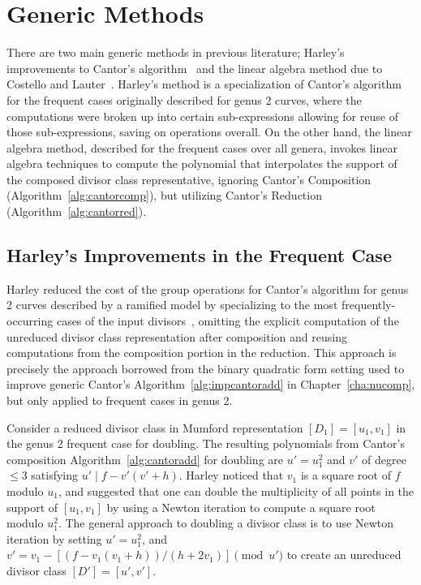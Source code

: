 \section{Generic Methods}
\label{sec:prevGenMethods}
There are two main generic methods in previous literature; Harley's improvements
to Cantor's algorithm~\cite{Harley_explicit_2000} and the linear algebra method
due to Costello and Lauter~\cite{CostelloLauter_geo_2011}. Harley's method is a
specialization of Cantor's algorithm for the frequent cases originally described
for genus 2 curves, where the computations were broken up into certain
sub-expressions allowing for reuse of those sub-expressions, saving on
operations overall. On the other hand, the linear algebra method, described for
the frequent cases over all genera, invokes linear algebra techniques to compute
the polynomial that interpolates the support of the composed divisor class
representative, ignoring Cantor's Composition (Algorithm~\ref{alg:cantorcomp}),
but utilizing Cantor's Reduction (Algorithm~\ref{alg:cantorred}). 

\subsection{Harley's Improvements in the Frequent Case} 
\label{sec:harley}
Harley reduced the cost of the group operations for Cantor's algorithm for
genus 2 curves described by a ramified model by specializing to the most
frequently-occurring cases of the input divisors~\cite{Harley_explicit_2000},
omitting the explicit computation of the unreduced divisor class representation
after composition and reusing computations from the composition portion in the
reduction. This approach is precisely the approach borrowed from the binary
quadratic form setting used to improve generic Cantor's
Algorithm~\ref{alg:impcantoradd} in Chapter~\ref{cha:nucomp}, but only applied
to frequent cases in genus 2.

Consider a reduced divisor class in Mumford representation $[D_1] = [u_1,v_1]$
in the genus 2 frequent case for doubling. The resulting polynomials from
Cantor's composition Algorithm~\ref{alg:cantoradd} for doubling are $u' = u_1^2$
and $v'$ of degree $\leq 3$ satisfying $u' \mid f - v'(v' + h)$. Harley noticed
that $v_1$ is a square root of $f$ modulo $u_1$, and suggested that one can
double the multiplicity of all points in the support of $[u_1,v_1]$ by using a
Newton iteration to compute a square root modulo $u_1^2$. The general approach
to doubling a divisor class is to use Newton iteration by setting $u' = u_1^2$,
and $v' = v_1 - [(f - v_1(v_1 + h))/(h+2v_1)] \pmod{u'}$ to create an unreduced
divisor class $[D'] = [u',v']$.

